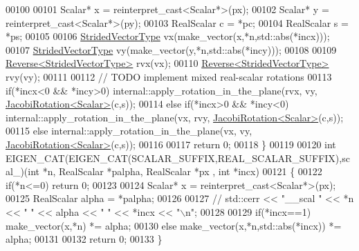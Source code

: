 \begin{DoxyCode}
00100 
00101   Scalar* x = \textcolor{keyword}{reinterpret\_cast<}Scalar*\textcolor{keyword}{>}(px);
00102   Scalar* y = \textcolor{keyword}{reinterpret\_cast<}Scalar*\textcolor{keyword}{>}(py);
00103   RealScalar c = *pc;
00104   RealScalar s = *ps;
00105 
00106   \hyperlink{group___core___module_class_eigen_1_1_map}{StridedVectorType} vx(make\_vector(x,*n,std::abs(*incx)));
00107   \hyperlink{group___core___module_class_eigen_1_1_map}{StridedVectorType} vy(make\_vector(y,*n,std::abs(*incy)));
00108 
00109   \hyperlink{group___core___module_class_eigen_1_1_reverse}{Reverse<StridedVectorType>} rvx(vx);
00110   \hyperlink{group___core___module_class_eigen_1_1_reverse}{Reverse<StridedVectorType>} rvy(vy);
00111 
00112   \textcolor{comment}{// TODO implement mixed real-scalar rotations}
00113        \textcolor{keywordflow}{if}(*incx<0 && *incy>0) internal::apply\_rotation\_in\_the\_plane(rvx, vy, 
      \hyperlink{group___jacobi___module_class_eigen_1_1_jacobi_rotation}{JacobiRotation<Scalar>}(c,s));
00114   \textcolor{keywordflow}{else} \textcolor{keywordflow}{if}(*incx>0 && *incy<0) internal::apply\_rotation\_in\_the\_plane(vx, rvy, 
      \hyperlink{group___jacobi___module_class_eigen_1_1_jacobi_rotation}{JacobiRotation<Scalar>}(c,s));
00115   \textcolor{keywordflow}{else}                        internal::apply\_rotation\_in\_the\_plane(vx, vy,  
      \hyperlink{group___jacobi___module_class_eigen_1_1_jacobi_rotation}{JacobiRotation<Scalar>}(c,s));
00116 
00117   \textcolor{keywordflow}{return} 0;
00118 \}
00119 
00120 \textcolor{keywordtype}{int} EIGEN\_CAT(EIGEN\_CAT(SCALAR\_SUFFIX,REAL\_SCALAR\_SUFFIX),scal\_)(\textcolor{keywordtype}{int} *n, RealScalar *palpha, RealScalar *px
      , \textcolor{keywordtype}{int} *incx)
00121 \{
00122   \textcolor{keywordflow}{if}(*n<=0) \textcolor{keywordflow}{return} 0;
00123 
00124   Scalar* x = \textcolor{keyword}{reinterpret\_cast<}Scalar*\textcolor{keyword}{>}(px);
00125   RealScalar alpha = *palpha;
00126 
00127 \textcolor{comment}{//   std::cerr << "\_\_scal " << *n << " " << alpha << " " << *incx << "\(\backslash\)n";}
00128 
00129   \textcolor{keywordflow}{if}(*incx==1)  make\_vector(x,*n) *= alpha;
00130   \textcolor{keywordflow}{else}          make\_vector(x,*n,std::abs(*incx)) *= alpha;
00131 
00132   \textcolor{keywordflow}{return} 0;
00133 \}
\end{DoxyCode}
